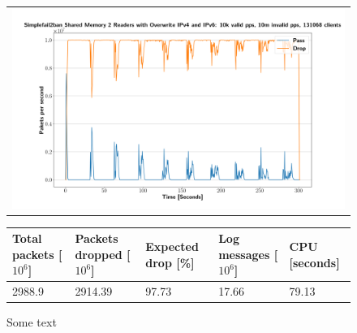 \begin{figure}[p]
	\label{fig:simplefail2ban:shm:or}
	\centering
	\scriptsize
	\begin{tabular}{c}
    	\centerline{\includegraphics[width=1.2\textwidth]{images/simplefail2ban_shm_2r_or_ipv46_v10k_iv10m_c131068.png}}
	\end{tabular}
	\begin{tabular}{lllll}
		\toprule
		\textbf{Total packets [$10^6$]} & \textbf{Packets dropped [$10^6$]} & \textbf{Expected drop [\%]} & \textbf{Log messages [$10^6$]} & \textbf{CPU [seconds]} \\ \midrule 
		2988.9 & 2914.39 & 97.73 & 17.66 & 79.13 \\
		\bottomrule
	\end{tabular}
	\caption[Simplefail2ban Shared Memory 2 Readers with Overwrite]{Some text}
\end{figure}


